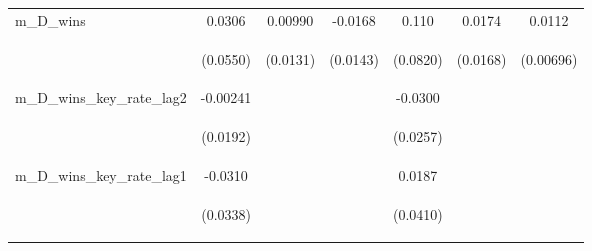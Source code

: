 \documentclass[]{article}
\begin{document}
\begin{center}
\begin{tabular}{lcccccc}
m\_D\_wins & 0.0306 & 0.00990 & -0.0168 & 0.110 & 0.0174 & 0.0112 \\
\vspace{4pt} & \begin{footnotesize}(0.0550)\end{footnotesize} & \begin{footnotesize}(0.0131)\end{footnotesize} & \begin{footnotesize}(0.0143)\end{footnotesize} & \begin{footnotesize}(0.0820)\end{footnotesize} & \begin{footnotesize}(0.0168)\end{footnotesize} & \begin{footnotesize}(0.00696)\end{footnotesize} \\
m\_D\_wins\_key\_rate\_lag2 & -0.00241 &  &  & -0.0300 &  &  \\
\vspace{4pt} & \begin{footnotesize}(0.0192)\end{footnotesize} & \begin{footnotesize}\end{footnotesize} & \begin{footnotesize}\end{footnotesize} & \begin{footnotesize}(0.0257)\end{footnotesize} & \begin{footnotesize}\end{footnotesize} & \begin{footnotesize}\end{footnotesize} \\
m\_D\_wins\_key\_rate\_lag1 & -0.0310 &  &  & 0.0187 &  &  \\
\vspace{4pt} & \begin{footnotesize}(0.0338)\end{footnotesize} & \begin{footnotesize}\end{footnotesize} & \begin{footnotesize}\end{footnotesize} & \begin{footnotesize}(0.0410)\end{footnotesize} & \begin{footnotesize}\end{footnotesize} & \begin{footnotesize}\end{footnotesize} \\

\end{tabular}
\end{center}
\end{document}

